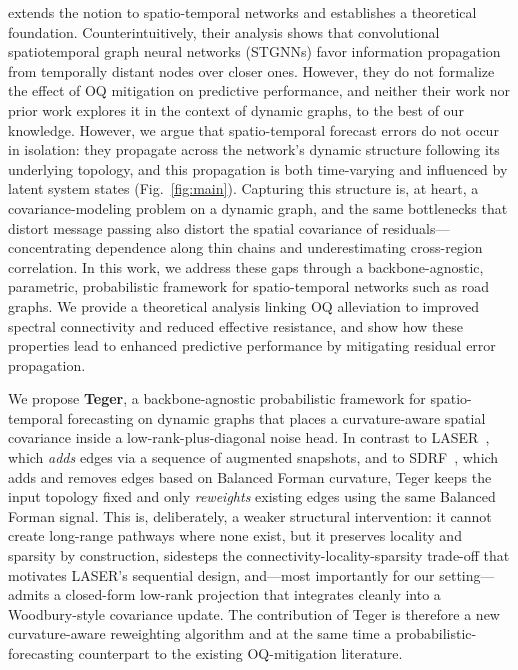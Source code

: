 \documentclass{article}
\theoremstyle{plain}
\theoremstyle{definition}
\theoremstyle{remark}
\begin{document}
\cite{mariscaover} extends the notion to spatio-temporal networks and establishes a theoretical foundation. 
Counterintuitively, their analysis shows that convolutional spatiotemporal graph neural networks (STGNNs) favor information propagation from temporally distant nodes over closer ones. However, they do not formalize the effect of OQ mitigation on predictive performance, and neither their work nor prior work explores it in the context of dynamic graphs, to the best of our knowledge. However, we argue that spatio-temporal forecast errors do not occur in isolation: they propagate across the network's dynamic structure following its underlying topology, and this propagation is both time-varying and influenced by latent system states (Fig.~\ref{fig:main}). Capturing this structure is, at heart, a covariance-modeling problem on a dynamic graph, and the same bottlenecks that distort message passing also distort the spatial covariance of residuals---concentrating dependence along thin chains and underestimating cross-region correlation. In this work, we address these gaps through a backbone-agnostic, parametric, probabilistic framework for spatio-temporal networks such as road graphs. We provide a theoretical analysis linking OQ alleviation to improved spectral connectivity and reduced effective resistance, and show how these properties lead to enhanced predictive performance by mitigating residual error propagation.



We propose \textbf{Teger}, a backbone-agnostic probabilistic framework for
spatio-temporal forecasting on dynamic graphs that places a curvature-aware
spatial covariance inside a low-rank-plus-diagonal noise head. In contrast
to LASER~\cite{barbero2024laser}, which \emph{adds} edges via a sequence of
augmented snapshots, and to SDRF~\cite{topping2022understandingoversquashingbottlenecksgraphs},
which adds and removes edges based on Balanced Forman curvature, Teger keeps
the input topology fixed and only \emph{reweights} existing edges using the
same Balanced Forman signal. This is, deliberately, a weaker structural
intervention: it cannot create long-range pathways where none exist, but it
preserves locality and sparsity by construction, sidesteps the
connectivity-locality-sparsity trade-off that motivates LASER's sequential
design, and---most importantly for our setting---admits a closed-form
low-rank projection that integrates cleanly into a Woodbury-style covariance
update. The contribution of Teger is therefore a new curvature-aware reweighting  algorithm and at the same time a probabilistic-forecasting counterpart to the
existing OQ-mitigation literature. 
\end{document}
